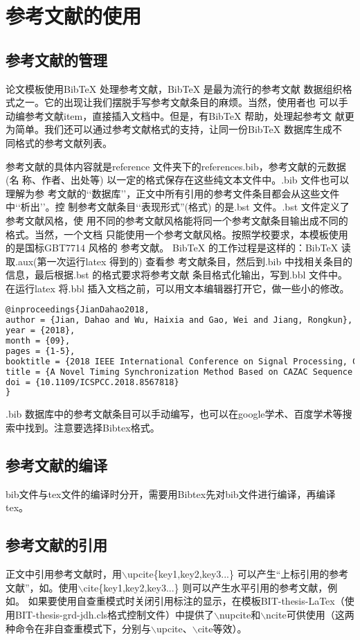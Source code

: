 \chapter{参考文献的使用}
\section{参考文献的管理}
论文模板使用BibTeX 处理参考文献，BibTeX 是最为流行的参考文献
数据组织格式之一。它的出现让我们摆脱手写参考文献条目的麻烦。当然，使用者也
可以手动编参考文献item，直接插入文档中。但是，有BibTeX 帮助，处理起参考文
献更为简单。我们还可以通过参考文献格式的支持，让同一份BibTeX 数据库生成不
同格式的参考文献列表。

参考文献的具体内容就是reference 文件夹下的references.bib，参考文献的元数据(名
称、作者、出处等) 以一定的格式保存在这些纯文本文件中。.bib 文件也可以理解为参
考文献的‘‘数据库’’，正文中所有引用的参考文件条目都会从这些文件中‘‘析出’’。控
制参考文献条目‘‘表现形式”(格式) 的是.bst 文件。.bst 文件定义了参考文献风格，使
用不同的参考文献风格能将同一个参考文献条目输出成不同的格式。当然，一个文档
只能使用一个参考文献风格。按照学校要求，本模板使用的是国标GBT7714 风格的
参考文献。
BibTeX 的工作过程是这样的：BibTeX 读取.aux(第一次运行latex 得到的) 查看参
考文献条目，然后到.bib 中找相关条目的信息，最后根据.bst 的格式要求将参考文献
条目格式化输出，写到.bbl 文件中。在运行latex 将.bbl 插入文档之前，可以用文本编辑器打开它，做一些小的修改。
\begin{lstlisting}[language={tex}, caption={.bib条目示例}]
@inproceedings{JianDahao2018,
author = {Jian, Dahao and Wu, Haixia and Gao, Wei and Jiang, Rongkun},
year = {2018},
month = {09},
pages = {1-5},
booktitle = {2018 IEEE International Conference on Signal Processing, Communications and Computing (ICSPCC)},
title = {A Novel Timing Synchronization Method Based on CAZAC Sequence for OFDM Systems},
doi = {10.1109/ICSPCC.2018.8567818}
}
\end{lstlisting}
.bib 数据库中的参考文献条目可以手动编写，也可以在google学术、百度学术等搜索中找到。注意要选择Bibtex格式。
\section{参考文献的编译}
bib文件与tex文件的编译时分开，需要用Bibtex先对bib文件进行编译，再编译tex。
\\

\section{参考文献的引用}
正文中引用参考文献时，用$\backslash$upcite\{key1,key2,key3...\} 可以产生“上标引用的参考文献”，如。使用$\backslash$cite\{key1,key2,key3...\} 则可以产生水平引用的参考文献，例如\cite{JianDahao2018}。
如果要使用自查重模式时关闭引用标注的显示，在模板BIT-thesis-LaTex（使用BIT-thesis-grd-jdh.cls格式控制文件）中提供了$\backslash$nupcite和$\backslash$ncite可供使用（这两种命令在非自查重模式下，分别与$\backslash$upcite、$\backslash$cite等效）。
